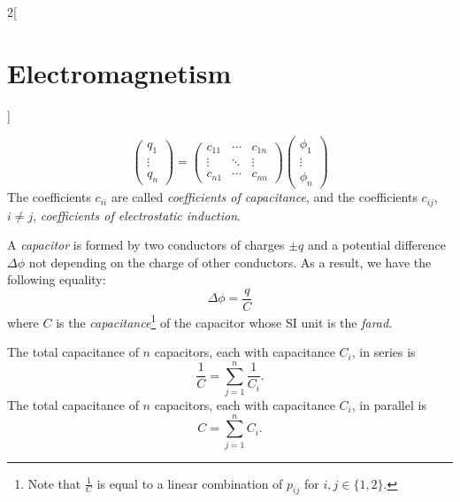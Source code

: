 \documentclass[../../../main.tex]{subfiles}
\begin{document}
\begin{multicols}{2}[\section{Electromagnetism}]
\begin{definition}
$$      \begin{pmatrix}
        q_1    \\
        \vdots \\
        q_n
      \end{pmatrix}=
      \begin{pmatrix}
        c_{11} & \cdots & c_{1n} \\
        \vdots & \ddots & \vdots \\
        c_{n1} & \cdots & c_{nn}
      \end{pmatrix}
      \begin{pmatrix}
        \phi_1 \\
        \vdots \\
        \phi_n
      \end{pmatrix}
    $$
    The coefficients $c_{ii}$ are called \emph{coefficients of capacitance}, and the coefficients $c_{ij}$, $i\ne j$, \emph{coefficients of electrostatic induction}.
  \end{definition}
  \begin{definition}[Capacitor]
    A \emph{capacitor} is formed by two conductors of charges $\pm q$ and a potential difference $\Delta\phi$ not depending on the charge of other conductors. As a result, we have the following equality: $$\Delta\phi=\frac{q}{C}$$ where $C$ is the \emph{capacitance}\footnote{Note that $\frac{1}{C}$ is equal to a linear combination of $p_{ij}$ for $i,j\in\{1,2\}$.} of the capacitor whose SI unit is the \emph{farad}.
  \end{definition}
  \begin{prop}
    The total capacitance of $n$ capacitors, each with capacitance $C_i$, in series is $$\frac{1}{C}=\sum_{j=1}^n\frac{1}{C_i}.$$
    The total capacitance of $n$ capacitors, each with capacitance $C_i$, in parallel is $$C=\sum_{j=1}^nC_i.$$
  \end{prop}

\end{multicols}
\end{document}
